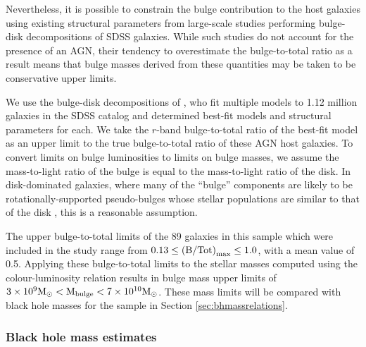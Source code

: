 Nevertheless, it is possible to constrain the bulge contribution to the host galaxies using existing structural parameters from large-scale studies performing bulge-disk decompositions of SDSS galaxies. While such studies do not account for the presence of an AGN, their tendency to overestimate the bulge-to-total ratio as a result means that bulge masses derived from these quantities may be taken to be conservative upper limits.

We use the bulge-disk decompositions of \citet{simard11}, who fit multiple models to 1.12 million galaxies in the SDSS catalog and determined best-fit models and structural parameters for each. We take the $r$-band bulge-to-total ratio {\notebsm of the best-fit model} as an upper limit to the true bulge-to-total ratio of these AGN host galaxies. To convert limits on bulge luminosities to limits on bulge masses, we assume the mass-to-light ratio of the bulge is equal to the mass-to-light ratio of the disk. In disk-dominated galaxies, where many of the ``bulge'' components are likely to be rotationally-supported pseudo-bulges \citep{kormendy04} whose stellar populations are similar to that of the disk {\notebsm \citep[e.g.,][]{graham01a,atheorypaperonthis}}, this is a reasonable assumption.

The upper bulge-to-total limits of the 89 galaxies in this sample which were included in the \citeauthor{simard11} study range from {\notebsm $0.13 \leq \left({\rm B/Tot}\right)_{\rm max} \leq 1.0$, with a mean value of 0.5}. Applying these bulge-to-total limits to the stellar masses computed using the colour-luminosity relation \citep{bell01,baldry06} results in bulge mass upper limits of {\notebsm $3 \times 10^9 \rm{M}_{\odot} < {\rm M_{bulge}} < 7 \times 10^{10} \rm{M}_{\odot} $}. These mass limits will be compared with black hole masses for the sample in Section \ref{sec:bhmassrelations}.


\subsubsection{Black hole mass estimates}\label{sec:bhmass}

